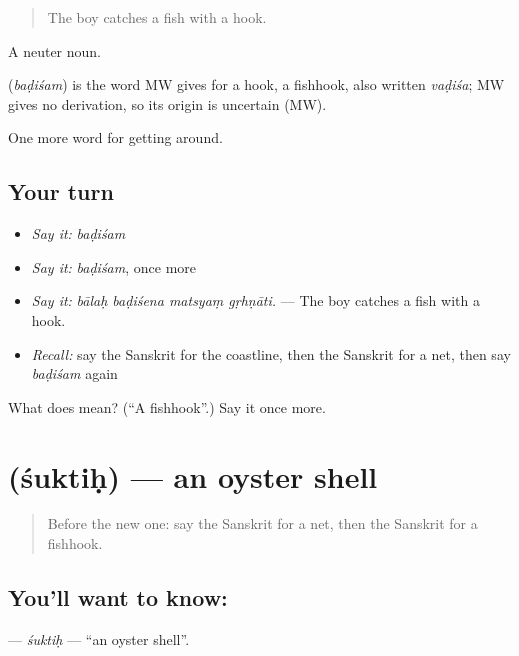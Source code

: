 \begin{quote}
The boy catches a fish with a hook.
\end{quote}

A neuter noun.

\begin{cousinweb}
\textbf{} (\emph{baḍiśam}) is the word MW gives for a hook, a fishhook, also written \emph{vaḍiśa}; MW gives no derivation, so its origin is uncertain (MW).
\end{cousinweb}

\begin{grammarlens}[title={What you've built}]
One more word for getting around.
\end{grammarlens}

\subsection*{Your turn}
\begin{itemize}
\raggedright
  \item \emph{Say it:} \emph{baḍiśam}
  \item \emph{Say it:} \emph{baḍiśam}, once more
  \item \emph{Say it:} \emph{bālaḥ baḍiśena matsyaṃ gṛhṇāti.} — The boy catches a fish with a hook.
  \item \emph{Recall:} say the Sanskrit for the coastline, then the Sanskrit for a net, then say \emph{baḍiśam} again
\end{itemize}

\begin{tcolorbox}[breakable,colback=teal!4,colframe=teal!35!black,title={Before you move on}]
What does  mean? (\textquotedblleft{}A fishhook\textquotedblright{}.) Say it once more.
\end{tcolorbox}
\section[\texorpdfstring{\sk{शुक्तिः} (śuktiḥ)}{शुक्तिः (śuktiḥ)}]{ (śuktiḥ) — an oyster shell}

\label{lesson:SA-C418-suktih}



\begin{quote}
Before the new one: say the Sanskrit for a net, then the Sanskrit for a fishhook.
\end{quote}

\subsection*{You'll want to know: }
\textbf{} — \emph{śuktiḥ} — \textquotedblleft{}an oyster shell\textquotedblright{}.

